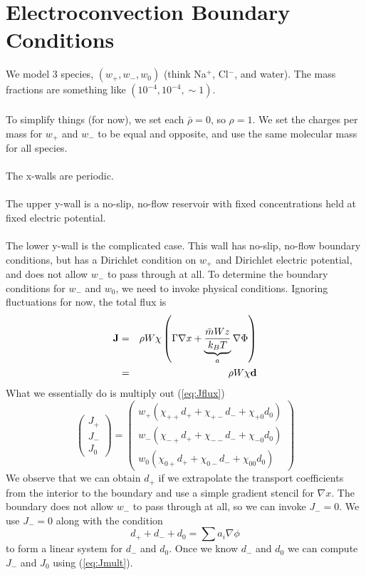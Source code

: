 \documentclass[final]{siamltex}
\begin{document}
\section{Electroconvection Boundary Conditions}

We model 3 species, $(w_+, w_-, w_0)$ (think Na$^+$, Cl$^-$, and water).
The mass fractions are something like $(10^{-4}, 10^{-4}, \sim 1)$.\\ \\

To simplify things (for now), we set each $\bar\rho=0$, so $\rho=1$.
We set the charges per mass for $w_+$ and $w_-$ to be equal and
opposite, and use the same molecular mass for all species.\\ \\

The x-walls are periodic.\\ \\

The upper y-wall is a no-slip, no-flow reservoir with fixed concentrations
held at fixed electric potential.\\ \\

The lower y-wall is the complicated case.  This wall 
has no-slip, no-flow boundary conditions, but has a Dirichlet condition
on $w_+$ and Dirichlet electric potential, and does not allow $w_-$ to
pass through at all.
To determine the boundary conditions for $w_-$ and $w_0$,
we need to invoke physical conditions.  Ignoring fluctuations for now,
the total flux is
\begin{eqnarray}
\bf{J} &=& \rho W \chi \left( \Gamma \nabla x + \underbrace{\frac{\bar{m} W z}{k_B T}}_{a}\nabla \Phi \right) \nonumber\\
&=& \rho W \chi {\bf d}\label{eq:Jflux}
\end{eqnarray}
What we essentially do is multiply out (\ref{eq:Jflux})
\begin{equation}
\left(\begin{array}{c}
J_+ \\
J_- \\
J_0
\end{array}\right)
=
\left(\begin{array}{ccc}
w_+(\chi_{++}d_+ + \chi_{+-}d_- + \chi_{+0}d_0) \\
w_-(\chi_{-+}d_+ + \chi_{--}d_- + \chi_{-0}d_0) \\
w_0(\chi_{0+}d_+ + \chi_{0-}d_- + \chi_{00}d_0)
\end{array}\right)\label{eq:Jmult}
\end{equation}
We observe that we can obtain $d_+$ if we extrapolate the transport coefficients from
the interior to the boundary and use a simple gradient stencil for $\nabla x$.
The boundary does not allow $w_-$ to pass through at all, so we can invoke $J_-=0$.
We use $J_-=0$ along with the condition
\begin{equation}
d_+ + d_- + d_0 = \sum a_i \nabla\phi
\end{equation}
to form a linear system for $d_-$ and $d_0$.
Once we know $d_-$ and $d_0$ we can compute $J_-$ and $J_0$ using (\ref{eq:Jmult}).
\end{document}
